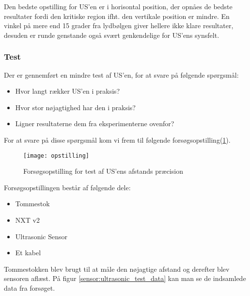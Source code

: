 Den bedste opstilling for US'en er i horisontal position, der opnåes de bedste resultater fordi den kritiske region ifht. den vertikale position er mindre.
En vinkel på mere end 15 grader fra lydbølgen giver hellere ikke klare resultater, desuden er runde genstande også svært genkendelige for US'ens synsfelt.

\subsubsection{Test}
Der er gennemført en mindre test af US'en, for at svare på følgende spørgsmål:

\begin{itemize}
\item Hvor langt rækker US'en i praksis?
\item Hvor stor nøjagtighed har den i praksis?
\item Ligner resultaterne dem fra eksperimenterne ovenfor?
\end{itemize}

For at svare på disse spørgsmål kom vi frem til følgende forsøgsopstilling(\ref{sensor:ultrasonic_opstilling}).

\begin{figure}[h]
\centering
\texttt{[image: opstilling]}
\caption{Forsøgsopstilling for test af US'ens afstands præcision}
\label{sensor:ultrasonic_opstilling}
\end{figure}

Forsøgsopstillingen består af følgende dele:
\begin{itemize}
\item Tommestok
\item NXT v2
\item \legoms Ultrasonic Sensor
\item Et \legoms kabel
\end{itemize}

Tommestokken blev brugt til at måle den nøjagtige afstand og derefter blev sensoren aflæst.
På figur \ref{sensor:ultrasonic_test_data} kan man se de indsamlede data fra forsøget.

